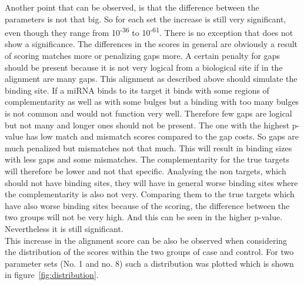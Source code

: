 \documentclass[12pt]{article}
\begin{document}
Another point that can be observed, is that the difference between the parameters is not that big. So for each set the increase is still very significant, even though they range from 10\textsuperscript{-36} to 10\textsuperscript{-61}. There is no exception that does not show a significance. The differences in the scores in general are obviously a result of scoring matches more or penalizing gaps more. A certain penalty for gaps should be present because it is not very logical from a biological site if in the alignment are many gaps. This alignment as described above should simulate the binding site. If a miRNA binds to its target it binds with some regions of complementarity as well as with some bulges but a binding with too many bulges is not common and would not function very well. Therefore few gaps are logical but not many and longer ones should not be present.
The one with the highest p-value has low match and mismatch scores compared to the gap costs. So gaps are much penalized but mismatches not that much. This will result in binding sizes with less gaps and some  mismatches. The complementarity for the true targets will therefore be lower and not that specific. Analysing the non targets, which should not have binding sites, they will have in general worse binding sites where the complementarity is also not very. Comparing them to the true targets which have also worse binding sites because of the scoring, the difference between the two groups will not be very high. And this can be seen in the higher p-value. Nevertheless it is still significant. \\

This increase in the alignment score can be also be observed when considering the distribution of the scores within the two groups of case and control. For two parameter sets (No. 1 and no. 8) such a distribution was plotted which is shown in figure~\ref{fig:distribution}. 
\end{document}

